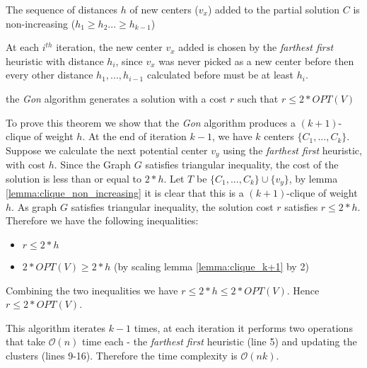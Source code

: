 \begin{lemma}\label{lemma:clique_non_increasing}
The sequence of distances $h$ of new centers ($v_x$) added to the partial solution $C$ is non-increasing ($h_1\geq h_2 ...\geq h_{k-1}$)
\end{lemma}

At each $i^{th}$ iteration, the new center $v_x$ added is chosen by the \emph{farthest first} \gls{heuristic} with distance $h_i$, since $v_x$ was never picked as a new center before then every other distance $h_1,...,h_{i-1}$ calculated before must be at least $h_i$.

\begin{theorem} 
the \emph{Gon} algorithm generates a solution with a cost $r$ such that $r\leq 2 * OPT(V)$
\end{theorem}

To prove this theorem we show that the \emph{Gon} algorithm produces a $(k+1)$-clique of weight $h$. At the end of iteration $k-1$, we have $k$ centers $\{C_1, ...,C_k\}$. Suppose we calculate the next potential center $v_y$ using the \emph{farthest first} heuristic, with cost $h$. Since the Graph $G$ satisfies triangular inequality, the cost of the solution is less than or equal to $2*h$. Let $T$ be $\{C_1, ...,C_k\}\cup\{v_y\}$, by lemma \ref{lemma:clique_non_increasing} it is clear that this is a $(k+1)$-clique of weight $h$. As graph $G$ satisfies triangular inequality, the solution cost $r$ satisfies $r\leq 2*h$. Therefore we have the following inequalities:
\begin{itemize}
    \item $r\leq 2*h$
    \item $2 * OPT(V)\geq 2*h$ (by scaling lemma \ref{lemma:clique_k+1} by 2) 
\end{itemize}
Combining the two inequalities we have $r\leq 2*h\leq 2 * OPT(V)$. Hence $r\leq 2 * OPT(V)$.

This algorithm iterates $k-1$ times, at each iteration it performs two operations that take $\mathcal{O}(n)$ time each - the \emph{farthest first} \gls{heuristic} (line 5) and updating the clusters (lines 9-16). Therefore the time complexity is $\mathcal{O}(nk)$.
